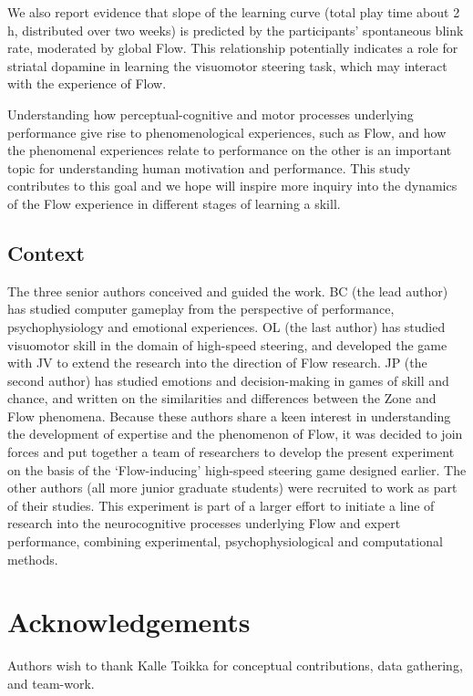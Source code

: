 \documentclass[a4paper,doc,floatsintext,natbib,10pt]{apa6}
\begin{document}
We also report evidence that slope of the learning curve (total play time about 2 h, distributed over two weeks) is predicted by the participants' spontaneous blink rate, moderated by global Flow. This relationship potentially indicates a role for striatal dopamine in learning the visuomotor steering task, which may interact with the experience of Flow.

Understanding how perceptual-cognitive and motor processes underlying performance give rise to phenomenological experiences, such as Flow, and how the phenomenal experiences relate to performance on the other is an important topic for understanding human motivation and performance. This study contributes to this goal and we hope will inspire more inquiry into the dynamics of the Flow experience in different stages of learning a skill.


\subsection*{Context}
The three senior authors conceived and guided the work. BC (the lead author) has studied computer gameplay from the perspective of performance, psychophysiology and emotional experiences. OL (the last author) has studied visuomotor skill in the domain of high-speed steering, and developed the game with JV to extend the research into the direction of Flow research. JP (the second author) has studied emotions and decision-making in games of skill and chance, and written on the similarities and differences between the Zone and Flow phenomena. Because these authors share a keen interest in understanding the development of expertise and the phenomenon of Flow, it was decided to join forces and put together a team of researchers to develop the present experiment on the basis of the `Flow-inducing' high-speed steering game designed earlier. The other authors (all more junior graduate students) were recruited to work as part of their studies. This experiment is part of a larger effort to initiate a line of research into the neurocognitive processes underlying Flow and expert performance, combining experimental, psychophysiological and computational methods.





\section*{Acknowledgements}
Authors wish to thank Kalle Toikka for conceptual contributions, data gathering, and team-work.
\end{document}
